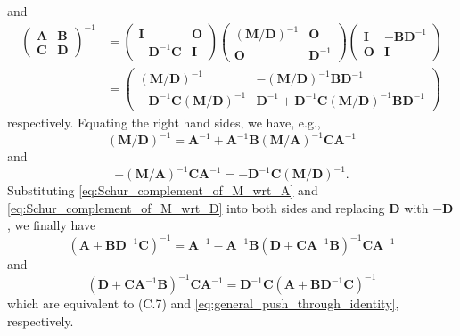 \documentclass[12pt,a4paper]{article}
\begin{document}
and
\begin{align}
\begin{pmatrix}
\mathbf{A} & \mathbf{B} \\
\mathbf{C} & \mathbf{D}
\end{pmatrix}^{-1}
&=
\begin{pmatrix}
\mathbf{I} & \mathbf{O} \\
-\mathbf{D}^{-1}\mathbf{C} & \mathbf{I}
\end{pmatrix}
\begin{pmatrix}
\left(\mathbf{M}/\mathbf{D}\right)^{-1} & \mathbf{O} \\
\mathbf{O} & \mathbf{D}^{-1}
\end{pmatrix}
\begin{pmatrix}
\mathbf{I} & -\mathbf{B}\mathbf{D}^{-1} \\
\mathbf{O} & \mathbf{I}
\end{pmatrix} \\
&=
\begin{pmatrix}
\left(\mathbf{M}/\mathbf{D}\right)^{-1} &
-\left(\mathbf{M}/\mathbf{D}\right)^{-1} \mathbf{B}\mathbf{D}^{-1} \\
-\mathbf{D}^{-1}\mathbf{C} \left(\mathbf{M}/\mathbf{D}\right)^{-1} &
\mathbf{D}^{-1} +
\mathbf{D}^{-1}\mathbf{C} \left(\mathbf{M}/\mathbf{D}\right)^{-1} \mathbf{B}\mathbf{D}^{-1}
\end{pmatrix}
\end{align}
respectively.
Equating the right hand sides, we have, e.g.,
\begin{equation}
\left(\mathbf{M}/\mathbf{D}\right)^{-1} =
\mathbf{A}^{-1} +
\mathbf{A}^{-1}\mathbf{B} \left(\mathbf{M}/\mathbf{A}\right)^{-1} \mathbf{C}\mathbf{A}^{-1}
\end{equation}
and
\begin{equation}
-\left(\mathbf{M}/\mathbf{A}\right)^{-1} \mathbf{C}\mathbf{A}^{-1} =
-\mathbf{D}^{-1}\mathbf{C} \left(\mathbf{M}/\mathbf{D}\right)^{-1} .
\end{equation}
Substituting \eqref{eq:Schur_complement_of_M_wrt_A} and \eqref{eq:Schur_complement_of_M_wrt_D}
into both sides and
replacing $\mathbf{D}$ with $-\mathbf{D}$,
we finally have
\begin{equation}
\left(\mathbf{A} + \mathbf{B}\mathbf{D}^{-1}\mathbf{C}\right)^{-1} =
\mathbf{A}^{-1} -
\mathbf{A}^{-1}\mathbf{B}
\left(\mathbf{D} + \mathbf{C}\mathbf{A}^{-1}\mathbf{B}\right)^{-1}
\mathbf{C}\mathbf{A}^{-1}
\end{equation}
and
\begin{equation}
\left(\mathbf{D} + \mathbf{C}\mathbf{A}^{-1}\mathbf{B}\right)^{-1} \mathbf{C}\mathbf{A}^{-1} =
\mathbf{D}^{-1}\mathbf{C} \left(\mathbf{A} + \mathbf{B}\mathbf{D}^{-1}\mathbf{C}\right)^{-1}
\end{equation}
which are equivalent to (C.7) and \eqref{eq:general_push_through_identity}, respectively.
\end{document}
